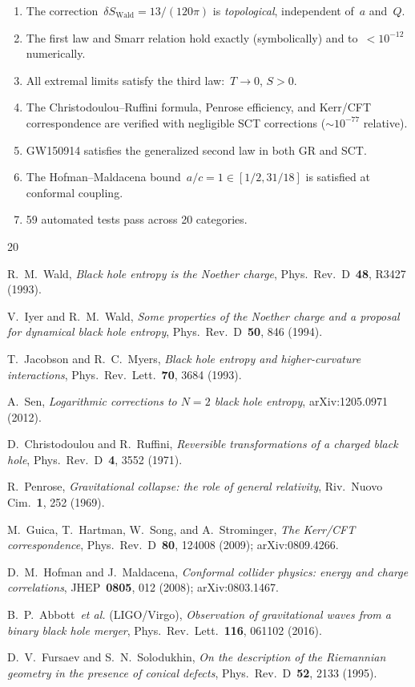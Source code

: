 \documentclass[11pt,a4paper]{article}
\begin{document}
\begin{enumerate}
  \item The correction~$\delta S_{\mathrm{Wald}} = 13/(120\pi)$ is
    \emph{topological}, independent of~$a$ and~$Q$.
  \item The first law and Smarr relation hold exactly (symbolically)
    and to~$< 10^{-12}$ numerically.
  \item All extremal limits satisfy the third law:~$T \to 0$,
    $S > 0$.
  \item The Christodoulou--Ruffini formula, Penrose efficiency, and
    Kerr/CFT correspondence are verified with negligible SCT
    corrections ($\sim 10^{-77}$ relative).
  \item GW150914 satisfies the generalized second law in both GR
    and SCT.
  \item The Hofman--Maldacena bound~$a/c = 1 \in [1/2, 31/18]$
    is satisfied at conformal coupling.
  \item 59 automated tests pass across 20 categories.
\end{enumerate}

\begin{thebibliography}{20}

R.~M.~Wald,
\textit{Black hole entropy is the Noether charge},
Phys.\ Rev.\ D~\textbf{48}, R3427 (1993).

V.~Iyer and R.~M.~Wald,
\textit{Some properties of the Noether charge and a proposal for
  dynamical black hole entropy},
Phys.\ Rev.\ D~\textbf{50}, 846 (1994).

T.~Jacobson and R.~C.~Myers,
\textit{Black hole entropy and higher-curvature interactions},
Phys.\ Rev.\ Lett.~\textbf{70}, 3684 (1993).

A.~Sen,
\textit{Logarithmic corrections to $N=2$ black hole entropy},
arXiv:1205.0971 (2012).

D.~Christodoulou and R.~Ruffini,
\textit{Reversible transformations of a charged black hole},
Phys.\ Rev.\ D~\textbf{4}, 3552 (1971).

R.~Penrose,
\textit{Gravitational collapse: the role of general relativity},
Riv.\ Nuovo Cim.~\textbf{1}, 252 (1969).

M.~Guica, T.~Hartman, W.~Song, and A.~Strominger,
\textit{The Kerr/CFT correspondence},
Phys.\ Rev.\ D~\textbf{80}, 124008 (2009);
arXiv:0809.4266.

D.~M.~Hofman and J.~Maldacena,
\textit{Conformal collider physics: energy and charge correlations},
JHEP~\textbf{0805}, 012 (2008);
arXiv:0803.1467.

B.~P.~Abbott~\textit{et al.} (LIGO/Virgo),
\textit{Observation of gravitational waves from a binary black hole
  merger},
Phys.\ Rev.\ Lett.~\textbf{116}, 061102 (2016).

D.~V.~Fursaev and S.~N.~Solodukhin,
\textit{On the description of the Riemannian geometry in the presence
  of conical defects},
Phys.\ Rev.\ D~\textbf{52}, 2133 (1995).

\end{thebibliography}
\end{document}
